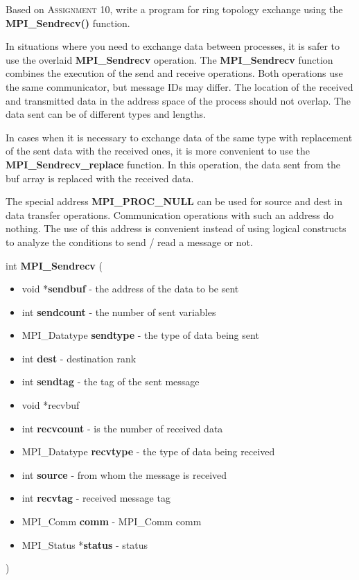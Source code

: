 \documentclass[%
12pt, %
final, %
oneside, %
onecolumn, %
centertags]{article} %
\theoremstyle{plain}
\theoremstyle{definition}
\theoremstyle{remark}
\begin{document}
Based on \textsc{Assignment 10}, write a program for ring topology exchange using the \textbf{MPI\_Sendrecv()} function.

In situations where you need to exchange data between processes, it is safer to use the overlaid 
\textbf{MPI\_Sendrecv} operation. The \textbf{MPI\_Sendrecv} function combines the execution of the send and receive 
operations. Both operations use the same communicator, but message IDs may differ. The location of the 
received and transmitted data in the address space of the process should not overlap. The data sent can be 
of different types and lengths.

In cases when it is necessary to exchange data of the same type with replacement of the sent data with the 
received ones, it is more convenient to use the \textbf{MPI\_Sendrecv\_replace} function. In this operation, the data 
sent from the buf array is replaced with the received data.

The special address \textbf{MPI\_PROC\_NULL} can be used for source and dest in data transfer operations. 
Communication operations with such an address do nothing. The use of this address is convenient instead of 
using logical constructs to analyze the conditions to send / read a message or not.


int \textbf{MPI\_Sendrecv} (
\begin{itemize}
	\item void *\textbf{sendbuf} - the address of the data to be sent
	\item int \textbf{sendcount} - the number of sent variables
	\item MPI\_Datatype \textbf{sendtype} - the type of data being sent
	\item int \textbf{dest} - destination rank
	\item int \textbf{sendtag} - the tag of the sent message
	\item void *recvbuf
	\item int \textbf{recvcount} - is the number of received data
	\item MPI\_Datatype \textbf{recvtype} - the type of data being received
	\item int \textbf{source} - from whom the message is received
	\item int \textbf{recvtag} - received message tag
	\item MPI\_Comm \textbf{comm} - MPI\_Comm comm
	\item MPI\_Status *\textbf{status} - status

\end{itemize}
)
\end{document}
